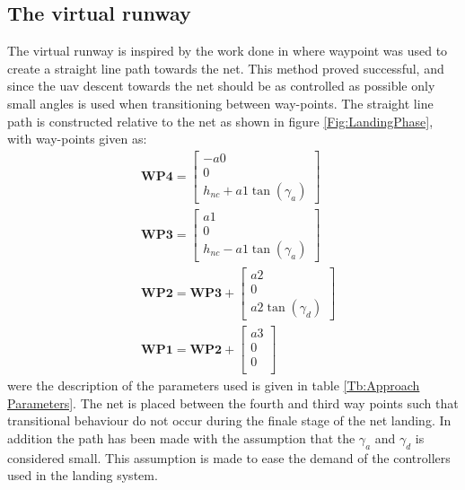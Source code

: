 \subsection{The virtual runway}\label{SS:netApproach}
The virtual runway is inspired by the work done in \citep{Skulstad&Syversen} where waypoint was used to create a straight line path towards the net. This method proved successful, and since the \gls{uav} descent towards the net should be as controlled as possible only small angles is used when transitioning between way-points. The straight line path is constructed relative to the net as shown in figure \ref{Fig:LandingPhase}, with way-points given as:
\begin{subequations}
\begin{align}
&\mathbf{WP4} = 
\begin{bmatrix}
-a0 \\
0 \\
h_{nc} + a1\tan(\gamma_a) 
\end{bmatrix}\\
&\mathbf{WP3} = 
\begin{bmatrix}
a1 \\
0 \\
h_{nc} - a1\tan(\gamma_a)
\end{bmatrix}\\
&\mathbf{WP2} = \mathbf{WP3} + 
\begin{bmatrix}
a2 \\
0 \\
a2\tan(\gamma_d)
\end{bmatrix}\\
&\mathbf{WP1} = \mathbf{WP2} + 
\begin{bmatrix}
a3 \\
0 \\
0 \\
\end{bmatrix}
\end{align}
\end{subequations}
were the description of the parameters used is given in table \ref{Tb:Approach Parameters}. The net is placed between the fourth and third way points such that transitional behaviour do not occur during the finale stage of the net landing. In addition the path has been made with the assumption that the $\gamma_a$ and $\gamma_d$ is considered small. This assumption is made to ease the demand of the controllers used in the landing system.
